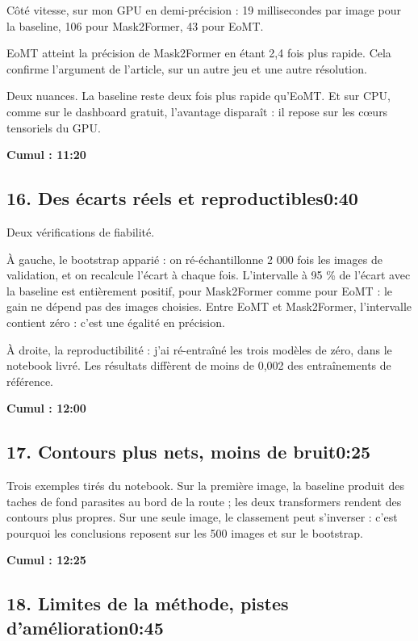 \documentclass[11pt,a4paper]{article}
\newcommand{\cumul}[1]{\par{\hfill\small\color{accent}\bfseries #1}\par}
\newcommand{\tempo}[1]{\hfill{\normalsize\color{accent}#1}}
\begin{document}
Côté vitesse, sur mon GPU en demi-précision : 19 millisecondes par image pour la baseline, 106 pour Mask2Former, 43 pour EoMT.

EoMT atteint la précision de Mask2Former en étant 2,4 fois plus rapide. Cela confirme l'argument de l'article, sur un autre jeu et une autre résolution.

Deux nuances. La baseline reste deux fois plus rapide qu'EoMT. Et sur CPU, comme sur le dashboard gratuit, l'avantage disparaît : il repose sur les cœurs tensoriels du GPU.

\cumul{Cumul : 11:20}

\subsection*{16. Des écarts réels et reproductibles\tempo{0:40}}

Deux vérifications de fiabilité.

À gauche, le bootstrap apparié : on ré-échantillonne 2 000 fois les images de validation, et on recalcule l'écart à chaque fois. L'intervalle à 95 \% de l'écart avec la baseline est entièrement positif, pour Mask2Former comme pour EoMT : le gain ne dépend pas des images choisies. Entre EoMT et Mask2Former, l'intervalle contient zéro : c'est une égalité en précision.

À droite, la reproductibilité : j'ai ré-entraîné les trois modèles de zéro, dans le notebook livré. Les résultats diffèrent de moins de 0,002 des entraînements de référence.

\cumul{Cumul : 12:00}

\subsection*{17. Contours plus nets, moins de bruit\tempo{0:25}}

Trois exemples tirés du notebook. Sur la première image, la baseline produit des taches de fond parasites au bord de la route ; les deux transformers rendent des contours plus propres. Sur une seule image, le classement peut s'inverser : c'est pourquoi les conclusions reposent sur les 500 images et sur le bootstrap.

\cumul{Cumul : 12:25}

\subsection*{18. Limites de la méthode, pistes d'amélioration\tempo{0:45}}
\end{document}
